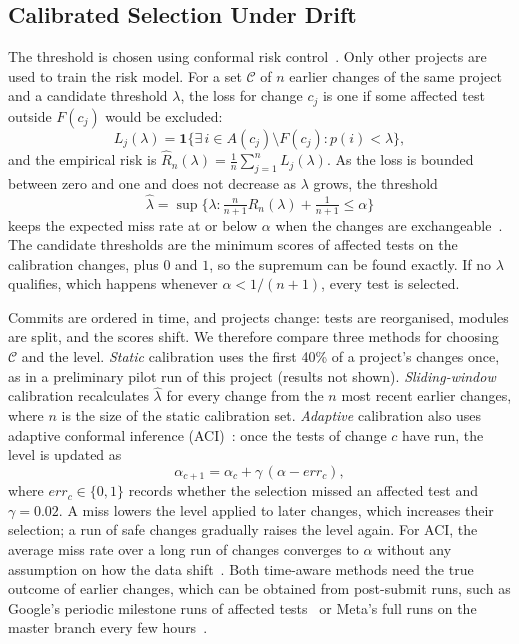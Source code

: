 \documentclass[conference]{IEEEtran}
\begin{document}
\subsection{Calibrated Selection Under Drift}\label{sec:crc}
The threshold is chosen using conformal risk control~\cite{angelopoulos2024crc}. Only other projects are used to train the risk model. For a set $\mathcal{C}$ of $n$ earlier changes of the same project and a candidate threshold $\lambda$, the loss for change $c_j$ is one if some affected test outside $F(c_j)$ would be excluded:
\begin{equation}
L_j(\lambda) = \mathbf{1}\big\{\exists\, i \in A(c_j)\setminus F(c_j) : p(i) < \lambda\big\}, \label{eq:loss}
\end{equation}
and the empirical risk is $\hat R_n(\lambda) = \tfrac{1}{n}\sum_{j=1}^{n} L_j(\lambda)$. As the loss is bounded between zero and one and does not decrease as $\lambda$ grows, the threshold
\begin{equation}
\hat\lambda = \sup\Big\{\lambda : \tfrac{n}{n+1}\hat R_n(\lambda) + \tfrac{1}{n+1} \le \alpha\Big\} \label{eq:crc}
\end{equation}
keeps the expected miss rate at or below $\alpha$ when the changes are exchangeable~\cite{angelopoulos2024crc}. The candidate thresholds are the minimum scores of affected tests on the calibration changes, plus $0$ and $1$, so the supremum can be found exactly. If no $\lambda$ qualifies, which happens whenever $\alpha < 1/(n+1)$, every test is selected.

Commits are ordered in time, and projects change: tests are reorganised, modules are split, and the scores shift. We therefore compare three methods for choosing $\mathcal{C}$ and the level. \emph{Static} calibration uses the first 40\% of a project's changes once, as in a preliminary pilot run of this project (results not shown). \emph{Sliding-window} calibration recalculates $\hat\lambda$ for every change from the $n$ most recent earlier changes, where $n$ is the size of the static calibration set. \emph{Adaptive} calibration also uses adaptive conformal inference (ACI)~\cite{gibbs2021aci}: once the tests of change $c$ have run, the level is updated as
\begin{equation}
\alpha_{c+1} = \alpha_c + \gamma\,(\alpha - \mathit{err}_c), \label{eq:aci}
\end{equation}
where $\mathit{err}_c\in\{0,1\}$ records whether the selection missed an affected test and $\gamma=0.02$. A miss lowers the level applied to later changes, which increases their selection; a run of safe changes gradually raises the level again. For ACI, the average miss rate over a long run of changes converges to $\alpha$ without any assumption on how the data shift~\cite{gibbs2021aci}. Both time-aware methods need the true outcome of earlier changes, which can be obtained from post-submit runs, such as Google's periodic milestone runs of affected tests~\cite{memon2017taming} or Meta's full runs on the master branch every few hours~\cite{machalica2019pts}.
\end{document}
